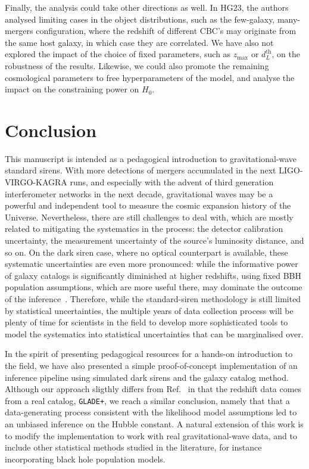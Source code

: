 \documentclass[%
preprint,
nofootinbib,
 amsmath,amssymb,
 aps,
]{revtex4-2}
\begin{document}
Finally, the analysis could take other directions as well. In HG23, the authors analysed limiting
cases in the object distributions, such as the few-galaxy, many-mergers configuration, where the
redshift of different CBC's may originate from the same host galaxy, in which case they are
correlated. We have also not explored the impact of the choice of fixed parameters, such as
$z_\text{max}$ or $d_L^{\text{th}}$, on the robustness of the results. Likewise, we could also
promote the remaining cosmological parameters to free hyperparameters of the model, and analyse the
impact on the constraining power on $H_0$.

\section{Conclusion}
\label{sec:conclusion}

This manuscript is intended as a pedagogical introduction to gravitational-wave standard sirens.
With more detections of mergers accumulated in the next LIGO-VIRGO-KAGRA runs, and especially with
the advent of third generation interferometer networks in the next decade, gravitational waves may
be a powerful and independent tool to measure the cosmic expansion history of the Universe.
Nevertheless, there are still challenges to deal with, which are mostly related to mitigating the
systematics in the process: the detector calibration uncertainty, the measurement uncertainty of
the source's luminosity distance, and so on. On the dark siren case, where no optical counterpart
is available, these systematic uncertainties are even more pronounced: while the informative power
of galaxy catalogs is significantly diminished at higher redshifts, using fixed BBH population
assumptions, which are more useful there, may dominate the outcome of the
inference~\cite{LIGOScientific:2021aug}. Therefore, while the standard-siren methodology is still
limited by statistical uncertainties, the multiple years of data collection process will be plenty
of time for scientists in the field to develop more sophisticated tools to model the systematics
into statistical uncertainties that can be marginalised over.

In the spirit of presenting pedagogical resources for a hands-on introduction to the field, we have
also presented a simple proof-of-concept implementation of an inference pipeline using simulated
dark sirens and the galaxy catalog method. Although our approach sligthly differs from
Ref.~ in that the redshift data comes from a real catalog, \texttt{GLADE+},
we reach a similar conclusion, namely that that a data-generating process consistent with the
likelihood model assumptions led to an unbiased inference on the Hubble constant. A natural
extension of this work is to modify the implementation to work with real gravitational-wave data,
and to include other statistical methods studied in the literature, for instance incorporating
black hole population models.

\end{document}
